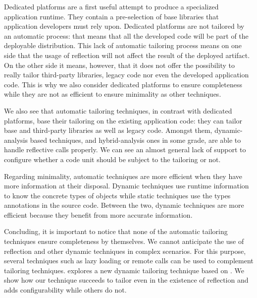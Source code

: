 Dedicated platforms are a first useful attempt to produce a specialized application runtime. They contain a pre-selection of base libraries that application developers must rely upon. Dedicated platforms are not tailored by an automatic process: that means that all the developed code will be part of the deployable distribution. This lack of automatic tailoring process means on one side that the usage of reflection will not affect the result of the deployed artifact. On the other side it means, however, that it does not offer the possibility to really tailor third-party libraries, legacy code nor even the developed application code. This is why we also consider dedicated platforms to ensure completeness while they are not as efficient to ensure minimality as other techniques.

We also see that automatic tailoring techniques, in contrast with dedicated platforms, base their tailoring on the existing application code: they can tailor base and third-party libraries as well as legacy code. Amongst them, dynamic-analysis based techniques, and hybrid-analysis ones in some grade, are able to handle reflective calls properly. We can see an almost general lack of support to configure whether a code unit should be subject to the tailoring or not.

Regarding minimality, automatic techniques are more efficient when they have more information at their disposal. Dynamic techniques use runtime information to know the concrete types of objects while static techniques use the types annotations in the source code. Between the two, dynamic techniques are more efficient because they benefit from more accurate information.

Concluding, it is important to notice that none of the automatic tailoring techniques ensure completeness by themselves. We cannot anticipate the use of reflection and other dynamic techniques in complex scenarios. For this purpose, several techniques such as lazy loading or remote calls can be used to complement tailoring techniques.  explores a new dynamic tailoring technique based on \Vtt. We show how our technique succeeds to tailor even in the existence of reflection and adds configurability while others do not. 


